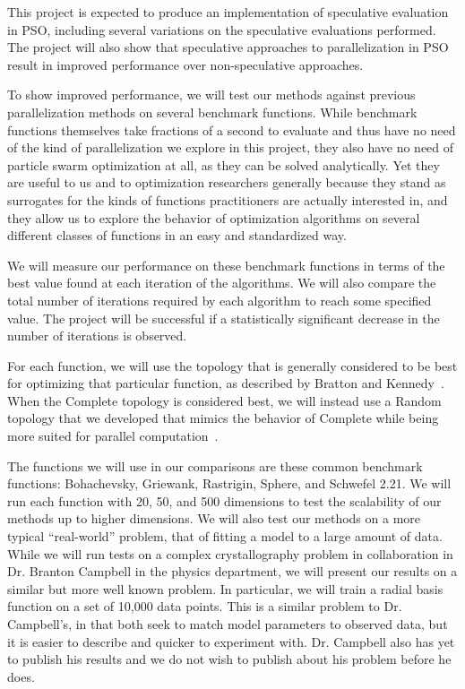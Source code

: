 \documentclass[ms]{byuprop}
\begin{document}
This project is expected to produce an implementation of speculative evaluation
in PSO, including several variations on the speculative evaluations performed.
The project will also show that speculative approaches to parallelization in
PSO result in improved performance over non-speculative approaches.

To show improved performance, we will test our methods against previous
parallelization methods on several benchmark functions.  While benchmark
functions themselves take fractions of a second to evaluate and thus have no
need of the kind of parallelization we explore in this project, they also have
no need of particle swarm optimization at all, as they can be solved
analytically.  Yet they are useful to us and to optimization researchers
generally because they stand as surrogates for the kinds of functions
practitioners are actually interested in, and they allow us to explore the
behavior of optimization algorithms on several different classes of functions
in an easy and standardized way.

We will measure our performance on these benchmark functions in terms of the
best value found at each iteration of the algorithms.  We will also compare the
total number of iterations required by each algorithm to reach some specified
value.  The project will be successful if a statistically significant decrease
in the number of iterations is observed.

For each function, we will use the topology that is generally considered to be
best for optimizing that particular function, as described by Bratton and
Kennedy~\cite{bratton-2007-defining-a-standard-for-pso}.  When the Complete
topology is considered best, we will instead use a Random topology that we
developed that mimics the behavior of Complete while being more suited for
parallel computation~\cite{mcnabb-2009-large-particle-swarms}.

The functions we will use in our comparisons are these common benchmark
functions: Bohachevsky, Griewank, Rastrigin, Sphere, and Schwefel 2.21.  We
will run each function with 20, 50, and 500 dimensions to test the scalability
of our methods up to higher dimensions.  We will also test our methods on a
more typical ``real-world'' problem, that of fitting a model to a large amount
of data.  While we will run tests on a complex crystallography problem in
collaboration in Dr. Branton Campbell in the physics department, we will
present our results on a similar but more well known problem.  In particular,
we will train a radial basis function on a set of 10,000 data points.  This is
a similar problem to Dr. Campbell's, in that both seek to match model
parameters to observed data, but it is easier to describe and quicker to
experiment with.  Dr. Campbell also has yet to publish his results and we do
not wish to publish about his problem before he does.
\end{document}
